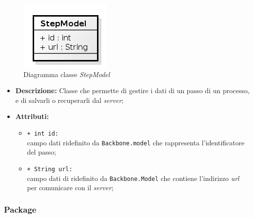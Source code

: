 \begin{figure}[H] \centering \includegraphics[width=%
\textwidth]
{./classi/client/model/StepModel.png} \caption{Diagramma classe  \textit{StepModel}}
\end{figure}

\begin{flushleft}
\begin{itemize}
\item \textbf{Descrizione:} Classe che permette di gestire i dati di un passo di un processo, e di salvarli o recuperarli dal \textit{server};
\item \textbf{Attributi:}
\begin{sloppypar}
\begin{itemize}
\item \texttt{+ int id:}\\ campo dati ridefinito da \texttt{Backbone.model} che rappresenta l'identificatore del passo;
\item \texttt{+ String url:}\\ campo dati di ridefinito da \texttt{Backbone.Model} che contiene l'indirizzo \textit{url} per comunicare con il \textit{server};
\end{itemize}
\end{sloppypar}
\end{itemize}
\end{flushleft}

\subsubsection{Package \collection{}}

